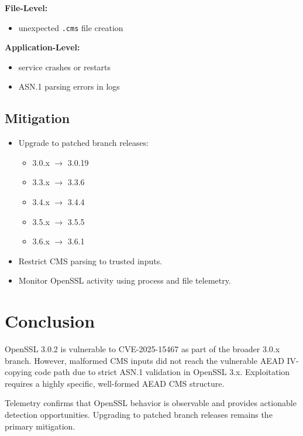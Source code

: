 \documentclass[12pt]{article}
\begin{document}
\textbf{File-Level:}
\begin{itemize}
    \item unexpected \texttt{.cms} file creation
\end{itemize}

\textbf{Application-Level:}
\begin{itemize}
    \item service crashes or restarts
    \item ASN.1 parsing errors in logs
\end{itemize}

\subsection*{Mitigation}
\begin{itemize}
    \item Upgrade to patched branch releases:
    \begin{itemize}
        \item 3.0.x $\rightarrow$ 3.0.19
        \item 3.3.x $\rightarrow$ 3.3.6
        \item 3.4.x $\rightarrow$ 3.4.4
        \item 3.5.x $\rightarrow$ 3.5.5
        \item 3.6.x $\rightarrow$ 3.6.1
    \end{itemize}
    \item Restrict CMS parsing to trusted inputs.
    \item Monitor OpenSSL activity using process and file telemetry.
\end{itemize}

\section{Conclusion}

OpenSSL 3.0.2 is vulnerable to CVE-2025-15467 as part of the broader 
3.0.x branch. However, malformed CMS inputs did not reach the vulnerable 
AEAD IV-copying code path due to strict ASN.1 validation in OpenSSL 3.x. 
Exploitation requires a highly specific, well-formed AEAD CMS structure.

Telemetry confirms that OpenSSL behavior is observable and provides 
actionable detection opportunities. Upgrading to patched branch releases 
remains the primary mitigation.
\end{document}

